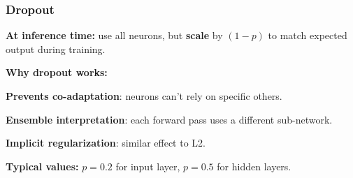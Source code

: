 \documentclass[notes,11pt, aspectratio=169]{beamer}
\newenvironment{wideitemize}{\itemize\addtolength{\itemsep}{10pt}}{\enditemize}
\newcommand{\vh}{\mathbf{h}}
\newcommand{\vm}{\mathbf{m}}
\begin{document}
\begin{frame}
\frametitle{Dropout}


\vspace{6pt}
\textbf{At inference time:} use all neurons, but \textbf{scale} by $(1-p)$ to match expected output during training.

\vspace{6pt}
\textbf{Why dropout works:}
\begin{wideitemize}
    \item \textbf{Prevents co-adaptation}: neurons can't rely on specific others.
    \item \textbf{Ensemble interpretation}: each forward pass uses a different sub-network.
    \item \textbf{Implicit regularization}: similar effect to L2.
\end{wideitemize}

\vspace{6pt}
\textbf{Typical values:} $p = 0.2$ for input layer, $p = 0.5$ for hidden layers.
\end{frame}
\end{document}
